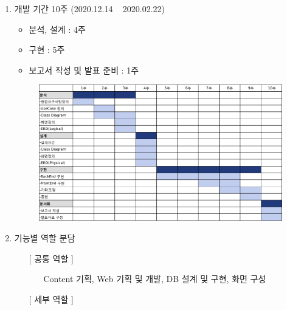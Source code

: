 \begin{enumerate}
    \item 개발 기간 10주 (2020.12.14 ~ 2020.02.22)
        \begin{itemize}
            \item 분석, 설계 : 4주
            \item 구현 : 5주
            \item 보고서 작성 및 발표 준비 : 1주
        \end{itemize}

        \begin{figure}[h]
            \begin{center}
                \includegraphics[width=16cm]{./Figure/devel.pdf}
            \end{center}
        \end{figure}


    \item 기능별 역할 분담
        \begin{itemize}
            \item[] [ 공통 역할 ] 
                \begin{itemize}
                    \item[] Content 기획, Web 기획 및 개발, DB 설계 및 구현, 화면 구성
                \end{itemize}
            \item[] [ 세부 역할 ]
            

\end{itemize}
\end{enumerate}
